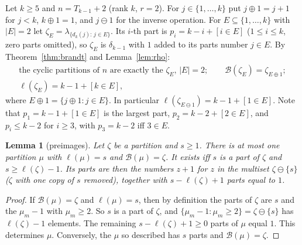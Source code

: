 \documentclass[11pt]{article}
\newtheorem{lemma}[theorem]{Lemma}
\theoremstyle{definition}
\newcommand{\B}{\mathcal{B}}
\renewcommand{\le}{\leqslant}
\renewcommand{\ge}{\geqslant}
\begin{document}
Let $k\ge5$ and $n=T_{k-1}+2$ (rank $k$, $r=2$).  For $j\in\{1,\dots,k\}$ put $j\oplus1=j+1$ for $j<k$, $k\oplus1=1$, and
$j\ominus1$ for the inverse operation.  For $E\subseteq\{1,\dots,k\}$ with $|E|=2$ let
$\zeta_E=\lambda_{\{d_k(j):\,j\in E\}}$.  Its $i$-th part is $p_i=k-i+[i\in E]$ ($1\le i\le k$, zero parts omitted), so
$\zeta_E$ is $\delta_{k-1}$ with $1$ added to its parts number $j\in E$.  By Theorem~\ref{thm:brandt} and
Lemma~\ref{lem:rho}:
\begin{equation}\label{eq:zeta2}
\begin{gathered}
\text{the cyclic partitions of $n$ are exactly the $\zeta_E$, $|E|=2$};\qquad \B(\zeta_E)=\zeta_{E\oplus1};\\
\ell(\zeta_E)=k-1+[k\in E],
\end{gathered}
\end{equation}
where $E\oplus1=\{j\oplus1:j\in E\}$.  In particular $\ell(\zeta_{E\ominus1})=k-1+[1\in E]$.  Note that $p_1=k-1+[1\in E]$ is
the largest part, $p_2=k-2+[2\in E]$, and $p_i\le k-2$ for $i\ge3$, with $p_3=k-2$ iff $3\in E$.

\begin{lemma}[preimages]\label{lem:preim}
Let $\zeta$ be a partition and $s\ge1$.  There is at most one partition $\mu$ with $\ell(\mu)=s$ and $\B(\mu)=\zeta$.  It
exists iff $s$ is a part of $\zeta$ and $s\ge\ell(\zeta)-1$.  Its parts are then the numbers $z+1$ for $z$ in the
multiset $\zeta\ominus\{s\}$ ($\zeta$ with one copy of $s$ removed), together with $s-\ell(\zeta)+1$ parts equal to $1$.
\end{lemma}
\begin{proof}
If $\B(\mu)=\zeta$ and $\ell(\mu)=s$, then by definition the parts of $\zeta$ are $s$ and the $\mu_m-1$ with $\mu_m\ge2$.  So
$s$ is a part of $\zeta$, and $\{\mu_m-1:\mu_m\ge2\}=\zeta\ominus\{s\}$ has $\ell(\zeta)-1$ elements.  The remaining
$s-\ell(\zeta)+1\ge0$ parts of $\mu$ equal $1$.  This determines $\mu$.  Conversely, the $\mu$ so described has $s$ parts
and $\B(\mu)=\zeta$.
\end{proof}
\end{document}
